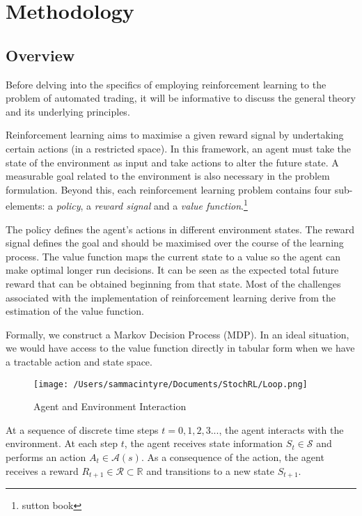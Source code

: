 \documentclass[12pt]{article}
\title{}
\author{}
\begin{document}
\maketitle



\section{Methodology}
\subsection{Overview}
Before delving into the specifics of employing reinforcement learning to the problem of automated trading, it will be informative to discuss the general theory and its underlying principles. 

Reinforcement learning aims to maximise a given reward signal by undertaking certain actions (in a restricted space). In this framework, an agent must take the state of the environment as input and take actions to alter the future state. A measurable goal related to the environment is also necessary in the problem formulation. Beyond this, each reinforcement learning problem contains four sub-elements: a \textit{policy}, a \textit{reward signal} and a \textit{value function}.\footnote{sutton book }

The policy defines the agent's actions in different environment states. The reward signal defines the goal and should be maximised over the course of the learning process. The value function maps the current state to a value so the agent can make optimal longer run decisions. It can be seen as the expected total future reward that can be obtained beginning from that state. Most of the challenges associated with the implementation of reinforcement learning derive from the estimation of the value function.

Formally, we construct a Markov Decision Process (MDP).
In an ideal situation, we would have access to the value function directly in tabular form when we have a tractable action and state space.

\begin{figure}
	\texttt{[image: /Users/sammacintyre/Documents/StochRL/Loop.png]}
	\caption{Agent and Environment Interaction}
	\label{fig:1}
\end{figure}

At a sequence of discrete time steps $t = 0,1,2,3...$, the agent interacts with the environment. At each step $t$, the agent receives state information $S _ { t } \in \mathcal{S}$ and performs an action $A _ { t } \in \mathcal { A } ( s )$. As a consequence of the action, the agent receives a reward $R _ { t + 1 } \in \mathcal { R } \subset \mathbb { R }$ and transitions to a new state $S _ { t + 1 }$.
\end{document}
